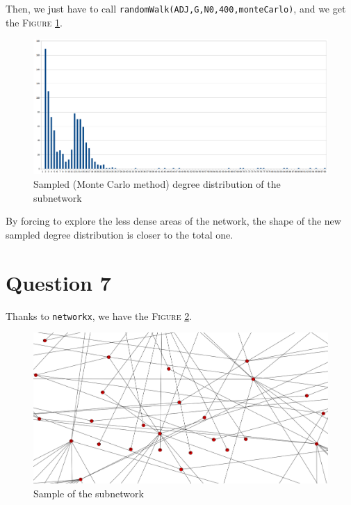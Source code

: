 \documentclass[a4paper]{report}
\begin{document}
Then, we just have to call \texttt{randomWalk(ADJ,G,N0,400,monteCarlo)}, and we get the \textsc{Figure} \ref{fig:montecarlo}.

\begin{figure}[!h]
        \includegraphics[scale=.17]{./montecarlo.png}
        \caption{Sampled (Monte Carlo method) degree distribution of the subnetwork}
        \label{fig:montecarlo}
\end{figure}

By forcing to explore the less dense areas of the network, the shape of the new sampled degree distribution is closer to the total one.

\section*{Question 7}
Thanks to \texttt{networkx}, we have the \textsc{Figure} \ref{fig:subnetwork}.

\begin{figure}[!h]
        \includegraphics[scale=.2]{./subnetwork.png}
        \caption{Sample of the subnetwork}
        \label{fig:subnetwork}
\end{figure}
\end{document}

